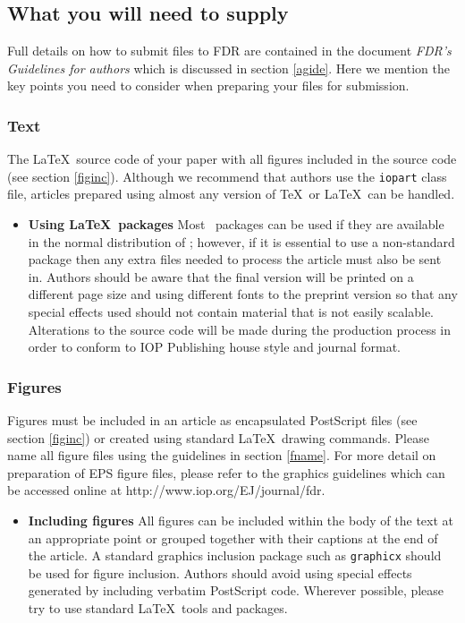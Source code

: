 \documentclass[12pt]{iopart}
\begin{document}
\subsection{What you will need to supply}
Full details on how to submit files to FDR are contained in the document {\it FDR's Guidelines for authors} which is discussed in section \ref{agide}. Here we mention the key points you need to consider when preparing your files for submission. 

\subsubsection{{\bf Text}} The \LaTeX\ source code of your paper with all figures included in 
the source code (see section \ref{figinc}). Although we recommend that authors use the \verb"iopart" class file, articles prepared using almost any  version of \TeX\ or \LaTeX\ 
can be handled.  
\begin{itemize}
\item {\bf Using \LaTeX\ packages} Most \LaTeXe\ packages can be used if they are 
available in the normal distribution of \LaTeXe; however, if it is essential to use 
a non-standard package then any extra files needed to process the article must 
also be sent in. Authors should be aware that the final version will be printed on 
a different page size and using different fonts to the preprint version so that any 
special effects used should not contain material that is not easily scalable.
Alterations to the source code will be made during the production process in order to 
conform to IOP Publishing house style and journal format.
\end{itemize}
\subsubsection{\bf Figures} Figures must be included in an article as encapsulated PostScript files
(see section \ref{figinc}) or created using standard \LaTeX\ drawing commands. 
 Please name all figure files using the guidelines in section \ref{fname}. For more detail
on preparation of EPS figure files, please refer to the graphics guidelines which can be accessed online at http://www.iop.org/EJ/journal/fdr. 

\begin{itemize}
\item {\bf Including figures\label{fig1}} All figures can be included within the body of the text 
at an appropriate point or grouped together with their captions at the end of the article. A standard graphics inclusion package such as \verb"graphicx" should be used for figure inclusion.
Authors should avoid using special effects generated by including verbatim
PostScript code. Wherever possible, please try to use standard \LaTeX\ tools 
and packages.
\end{itemize}
\end{document}
